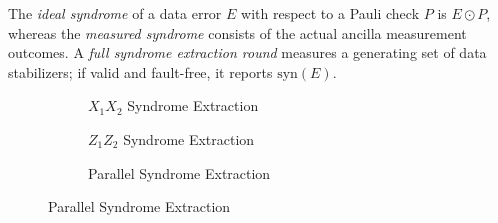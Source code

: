 \documentclass[acmsmall,screen,review,anonymous,nonacm]{acmart}
\begin{document}
The \emph{ideal syndrome} of a data error $E$
with respect to a Pauli check $P$ is $E\odot P$,
whereas the \emph{measured syndrome} consists of
the actual ancilla measurement outcomes.
A \emph{full syndrome extraction round} measures
a generating set of data stabilizers; if valid and fault-free,
it reports $\mathrm{syn}(E)$.

\begin{figure}[h]
    \centering
    
    \begin{subfigure}{0.29\linewidth}
        \centering
        \caption{$X_1X_2$ Syndrome Extraction}
        \label{fig:iso-x}
    \end{subfigure}
    \hfill
    \begin{subfigure}{0.29\linewidth}
        \centering
        \caption{$Z_1Z_2$ Syndrome Extraction}
        \label{fig:iso-z}
    \end{subfigure}
    \hfill
    \begin{subfigure}{0.39\linewidth}
        \centering
        \caption{Parallel Syndrome Extraction }
        \label{fig:combined-bad}
    \end{subfigure}
    

\end{figure}
\end{document}
